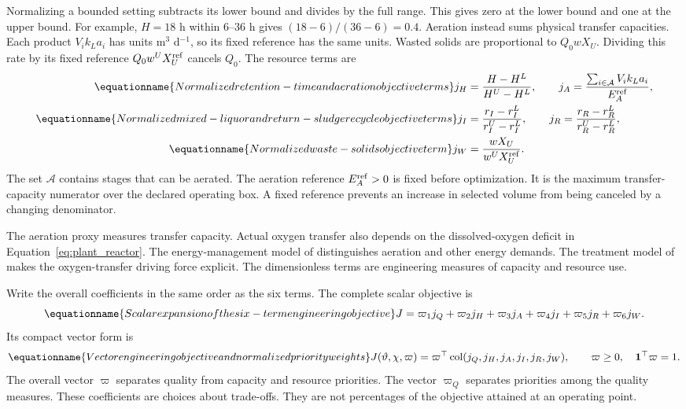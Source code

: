 Normalizing a bounded setting subtracts its lower bound and divides by the full range. This gives zero at the lower bound and one at the upper bound. For example, $H=18$ h within 6--36 h gives $(18-6)/(36-6)=0.4$. Aeration instead sums physical transfer capacities. Each product $V_i k_La_i$ has units m$^3$ d$^{-1}$, so its fixed reference has the same units. Wasted solids are proportional to $Q_0wX_U$. Dividing this rate by its fixed reference $Q_0w^UX_U^{\rm ref}$ cancels $Q_0$. The resource terms are
\begin{align}
\equationname{Normalized retention-time and aeration objective terms}
j_H&=\frac{H-H^L}{H^U-H^L},\qquad
j_A=\frac{\sum_{i\in\mathcal A}V_i k_La_i}{E_A^{\rm ref}},\\
\equationname{Normalized mixed-liquor and return-sludge recycle objective terms}
j_I&=\frac{r_I-r_I^L}{r_I^U-r_I^L},\qquad
j_R=\frac{r_R-r_R^L}{r_R^U-r_R^L},\\
\equationname{Normalized waste-solids objective term}
j_W&=\frac{wX_U}{w^UX_U^{\rm ref}}.
\label{eq:plant_resource_objective}
\end{align}
The set $\mathcal A$ contains stages that can be aerated. The aeration reference $E_A^{\rm ref}>0$ is fixed before optimization. It is the maximum transfer-capacity numerator over the declared operating box. A fixed reference prevents an increase in selected volume from being canceled by a changing denominator.

The aeration proxy measures transfer capacity. Actual oxygen transfer also depends on the dissolved-oxygen deficit in Equation~\eqref{eq:plant_reactor}. The energy-management model of \citet{Miederer2025} distinguishes aeration and other energy demands. The treatment model of \citet{Zhang2026} makes the oxygen-transfer driving force explicit. The dimensionless terms are engineering measures of capacity and resource use.

Write the overall coefficients in the same order as the six terms. The complete scalar objective is
\begin{equation}
\equationname{Scalar expansion of the six-term engineering objective}
J=\varpi_1j_Q+\varpi_2j_H+\varpi_3j_A+\varpi_4j_I+\varpi_5j_R+\varpi_6j_W.
\end{equation}
Its compact vector form is
\begin{equation}
\equationname{Vector engineering objective and normalized priority weights}
J(\vartheta,\chi,\varpi)=\varpi^\top
\operatorname{col}(j_Q,j_H,j_A,j_I,j_R,j_W),\qquad
\varpi\ge0,\quad\mathbf1^\top\varpi=1.
\label{eq:plant_engineering_objective}
\end{equation}
The overall vector $\varpi$ separates quality from capacity and resource priorities. The vector $\varpi_Q$ separates priorities among the quality measures. These coefficients are choices about trade-offs. They are not percentages of the objective attained at an operating point.

